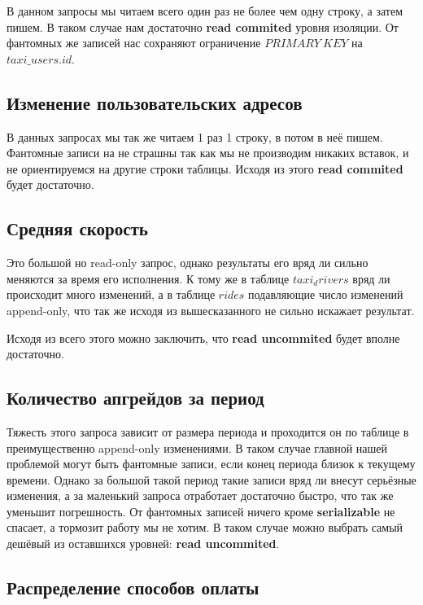 \documentclass[fontsize=12pt]{article}
\begin{document}
В данном запросы мы читаем всего один раз не более чем одну строку, а затем пишем. В таком случае нам достаточно \textbf{read commited} уровня изоляции. От фантомных же записей нас сохраняют ограничение $PRIMARY\ KEY$ на $taxi\_users.id$.


\subsection*{Изменение пользовательских адресов}

В данных запросах мы так же читаем 1 раз 1 строку, в потом в неё пишем. Фантомные записи на не страшны так как мы не производим никаких вставок, и не ориентируемся на другие строки таблицы. Исходя из этого \textbf{read commited} будет достаточно.

\subsection*{Средняя скорость}

Это большой но read-only запрос, однако результаты его вряд ли сильно меняются за время его исполнения. К тому же в таблице $taxi_drivers$ вряд ли происходит много изменений, а в таблице $rides$ подавляющие число изменений append-only, что так же исходя из вышесказанного не сильно искажает результат.

Исходя из всего этого можно заключить, что \textbf{read uncommited} будет вполне достаточно. 

\subsection*{Количество апгрейдов за период}

Тяжесть этого запроса зависит от размера периода и проходится он по таблице в преимущественно append-only изменениями. В таком случае главной нашей проблемой могут быть фантомные записи, если конец периода близок к текущему времени. Однако за большой такой период такие записи вряд ли внесут серьёзные изменения, а за маленький запроса отработает достаточно быстро, что так же уменьшит погрешность. От фантомных записей ничего кроме \textbf{serializable} не спасает, а тормозит работу мы не хотим. В таком случае можно выбрать самый дешёвый из оставшихся уровней: \textbf{read uncommited}.

\subsection*{Распределение способов оплаты}
\end{document}
